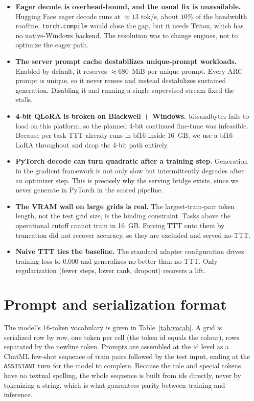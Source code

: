 \documentclass[11pt]{article}
\begin{document}
\begin{itemize}[leftmargin=1.4em,itemsep=3pt]
\item \textbf{Eager decode is overhead-bound, and the usual fix is unavailable.} Hugging Face eager
decode runs at $\approx 13$ tok/s, about $10\%$ of the bandwidth roofline. \texttt{torch.compile}
would close the gap, but it needs Triton, which has no native-Windows backend. The resolution was to
change engines, not to optimize the eager path.
\item \textbf{The server prompt cache destabilizes unique-prompt workloads.} Enabled by default, it
reserves $\approx 680$~MiB per unique prompt. Every ARC prompt is unique, so it never reuses and
instead destabilizes sustained generation. Disabling it and running a single supervised stream fixed
the stalls.
\item \textbf{4-bit QLoRA is broken on Blackwell + Windows.} bitsandbytes fails to load on this
platform, so the planned 4-bit continued fine-tune was infeasible. Because per-task TTT already runs
in bf16 inside 16~GB, we use a bf16 LoRA throughout and drop the 4-bit path entirely.
\item \textbf{PyTorch decode can turn quadratic after a training step.} Generation in the gradient
framework is not only slow but intermittently degrades after an optimizer step. This is precisely why
the serving bridge exists, since we never generate in PyTorch in the scored pipeline.
\item \textbf{The VRAM wall on large grids is real.} The largest-train-pair token length, not the
test grid size, is the binding constraint. Tasks above the operational cutoff cannot train in 16~GB.
Forcing TTT onto them by truncation did not recover accuracy, so they are excluded and served no-TTT.
\item \textbf{Naive TTT ties the baseline.} The standard adapter configuration drives training loss
to $0.000$ and generalizes no better than no-TTT. Only regularization (fewer steps, lower rank,
dropout) recovers a lift.
\end{itemize}

\section{Prompt and serialization format}
\label{app:format}
The model's 16-token vocabulary is given in Table~\ref{tab:vocab}. A grid is serialized row by row,
one token per cell (the token id equals the colour), rows separated by the newline token. Prompts are
assembled at the id level as a ChatML few-shot sequence of train pairs followed by the test input,
ending at the \texttt{ASSISTANT} turn for the model to complete. Because the role and special tokens
have no textual spelling, the whole sequence is built from ids directly, never by tokenizing a
string, which is what guarantees parity between training and inference.
\end{document}
